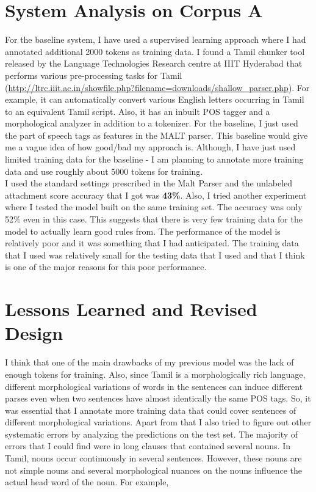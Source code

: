 \documentclass[11pt,letterpaper]{article}
\begin{document}
\section{System Analysis on Corpus A}
For the baseline system, I have used a supervised learning approach where I had annotated additional 2000 tokens as training data. I found a Tamil chunker tool released
by the Language Technologies Research centre at IIIT Hyderabad that performs various pre-processing tasks for Tamil (\url{http://ltrc.iiit.ac.in/showfile.php?filename=downloads/shallow_parser.php}). For example, it can automatically
convert various English letters occurring in Tamil to an equivalent Tamil script. Also, it has an inbuilt POS tagger and a morphological analyzer in addition 
to a tokenizer. For the baseline, I just used the part of speech tags as features in the MALT parser. This baseline would give me a vague idea
of how good/bad my approach is. Although, I have just used limited training data for the baseline - I am planning to annotate more training data 
and use roughly about 5000 tokens for training. \\
 
I used the standard settings prescribed in the Malt Parser and the unlabeled attachment score accuracy that I got was \textbf{43\%}. Also, I tried another
experiment where I tested the model built on the same training set. The accuracy was only 52\% even in this case. This suggests that there is very few
training data for the model to actually learn good rules from. The performance of the model is relatively poor and it was something that I had anticipated. 
The training data that I used was relatively small for the testing data that I used and that I think is one of the major reasons for this poor performance. 

\section{Lessons Learned and Revised Design}

I think that one of the main drawbacks of my previous model was the lack of enough tokens for training. Also, since Tamil is a morphologically rich 
language, different morphological variations of words in the sentences can induce different parses even when two sentences have almost identically
the same POS tags. So, it was essential that I annotate more training data that could cover sentences of different morphological variations. 
Apart from that I also tried to figure out other systematic errors by analyzing the predictions on the test set. The majority of errors that I could find
were in long clauses that contained several nouns. In Tamil, nouns occur continuously in several sentences. However, these nouns are not simple nouns
and several morphological nuances on the nouns influence the actual head word of the noun. For example, 
\end{document}
